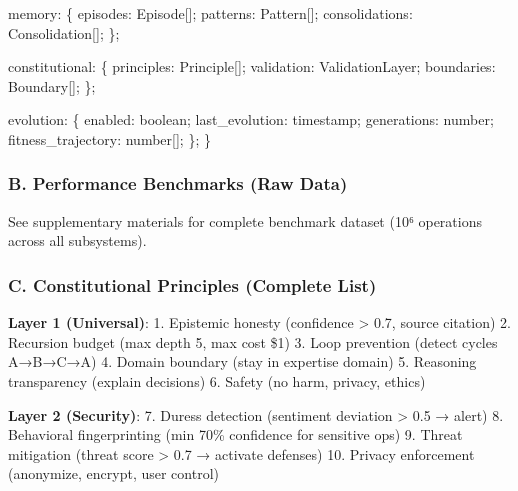 \documentclass[
]{article}
\newenvironment{Shaded}{}{}
\newcommand{\DataTypeTok}[1]{\textcolor[rgb]{0.56,0.13,0.00}{#1}}
\newcommand{\NormalTok}[1]{#1}
\newcommand{\OperatorTok}[1]{\textcolor[rgb]{0.40,0.40,0.40}{#1}}
\begin{document}
\begin{Shaded}
\begin{Highlighting}[]
\NormalTok{  memory}\OperatorTok{:}\NormalTok{ \{}
\NormalTok{    episodes}\OperatorTok{:}\NormalTok{ Episode[]}\OperatorTok{;}
\NormalTok{    patterns}\OperatorTok{:}\NormalTok{ Pattern[]}\OperatorTok{;}
\NormalTok{    consolidations}\OperatorTok{:}\NormalTok{ Consolidation[]}\OperatorTok{;}
\NormalTok{  \}}\OperatorTok{;}

\NormalTok{  constitutional}\OperatorTok{:}\NormalTok{ \{}
\NormalTok{    principles}\OperatorTok{:}\NormalTok{ Principle[]}\OperatorTok{;}
\NormalTok{    validation}\OperatorTok{:}\NormalTok{ ValidationLayer}\OperatorTok{;}
\NormalTok{    boundaries}\OperatorTok{:}\NormalTok{ Boundary[]}\OperatorTok{;}
\NormalTok{  \}}\OperatorTok{;}

\NormalTok{  evolution}\OperatorTok{:}\NormalTok{ \{}
\NormalTok{    enabled}\OperatorTok{:} \DataTypeTok{boolean}\OperatorTok{;}
\NormalTok{    last\_evolution}\OperatorTok{:}\NormalTok{ timestamp}\OperatorTok{;}
\NormalTok{    generations}\OperatorTok{:} \DataTypeTok{number}\OperatorTok{;}
\NormalTok{    fitness\_trajectory}\OperatorTok{:} \DataTypeTok{number}\NormalTok{[]}\OperatorTok{;}
\NormalTok{  \}}\OperatorTok{;}
\NormalTok{\}}
\end{Highlighting}
\end{Shaded}

\subsubsection{B. Performance Benchmarks (Raw
Data)}\label{b.-performance-benchmarks-raw-data}

See supplementary materials for complete benchmark dataset (10⁶
operations across all subsystems).

\subsubsection{C. Constitutional Principles (Complete
List)}\label{c.-constitutional-principles-complete-list}

\textbf{Layer 1 (Universal)}: 1. Epistemic honesty (confidence
\textgreater{} 0.7, source citation) 2. Recursion budget (max depth 5,
max cost \$1) 3. Loop prevention (detect cycles A→B→C→A) 4. Domain
boundary (stay in expertise domain) 5. Reasoning transparency (explain
decisions) 6. Safety (no harm, privacy, ethics)

\textbf{Layer 2 (Security)}: 7. Duress detection (sentiment deviation
\textgreater{} 0.5 → alert) 8. Behavioral fingerprinting (min 70\%
confidence for sensitive ops) 9. Threat mitigation (threat score
\textgreater{} 0.7 → activate defenses) 10. Privacy enforcement
(anonymize, encrypt, user control)
\end{document}
